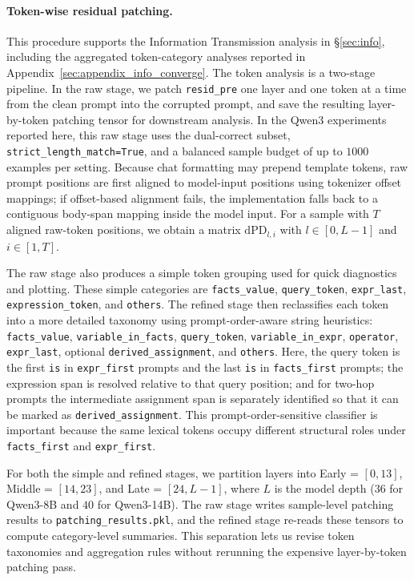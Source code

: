 \documentclass[11pt]{article}
\begin{document}
\paragraph{Token-wise residual patching.}
This procedure supports the Information Transmission analysis in §\ref{sec:info}, including the aggregated token-category analyses reported in Appendix~\ref{sec:appendix_info_converge}.
The token analysis is a two-stage pipeline. In the raw stage, we patch \texttt{resid\_pre} one layer and one token at a time from the clean prompt into the corrupted prompt, and save the resulting layer-by-token patching tensor for downstream analysis. In the Qwen3 experiments reported here, this raw stage uses the dual-correct subset, \texttt{strict\_length\_match=True}, and a balanced sample budget of up to $1000$ examples per setting. Because chat formatting may prepend template tokens, raw prompt positions are first aligned to model-input positions using tokenizer offset mappings; if offset-based alignment fails, the implementation falls back to a contiguous body-span mapping inside the model input. For a sample with $T$ aligned raw-token positions, we obtain a matrix $\mathrm{dPD}_{l,i}$ with $l \in [0,L-1]$ and $i \in [1,T]$.

The raw stage also produces a simple token grouping used for quick diagnostics and plotting. These simple categories are \texttt{facts\_value}, \texttt{query\_token}, \texttt{expr\_last}, \texttt{expression\_token}, and \texttt{others}. The refined stage then reclassifies each token into a more detailed taxonomy using prompt-order-aware string heuristics:
\texttt{facts\_value}, \texttt{variable\_in\_facts}, \texttt{query\_token}, \texttt{variable\_in\_expr}, \texttt{operator}, \texttt{expr\_last}, optional \texttt{derived\_assignment}, and \texttt{others}.
Here, the query token is the first \texttt{is} in \texttt{expr\_first} prompts and the last \texttt{is} in \texttt{facts\_first} prompts; the expression span is resolved relative to that query position; and for two-hop prompts the intermediate assignment span is separately identified so that it can be marked as \texttt{derived\_assignment}. This prompt-order-sensitive classifier is important because the same lexical tokens occupy different structural roles under \texttt{facts\_first} and \texttt{expr\_first}.

For both the simple and refined stages, we partition layers into Early = $[0,13]$, Middle = $[14,23]$, and Late = $[24,L-1]$, where $L$ is the model depth ($36$ for Qwen3-8B and $40$ for Qwen3-14B). The raw stage writes sample-level patching results to \texttt{patching\_results.pkl}, and the refined stage re-reads these tensors to compute category-level summaries. This separation lets us revise token taxonomies and aggregation rules without rerunning the expensive layer-by-token patching pass.
\end{document}
